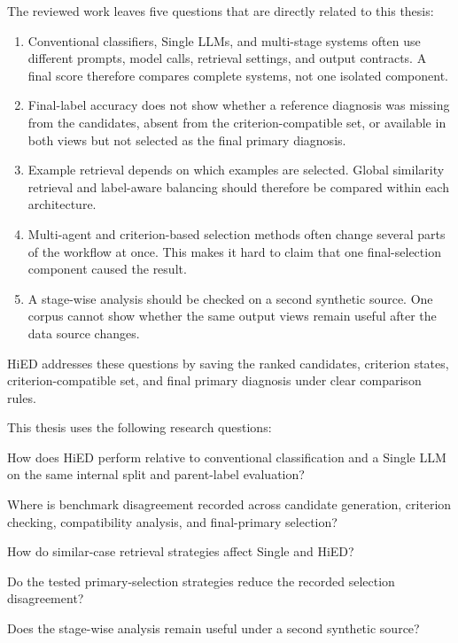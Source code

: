 \documentclass[12pt,a4paper,oneside]{report}
\begin{document}
The reviewed work leaves five questions that are directly related to this thesis:

\begin{enumerate}
    \item Conventional classifiers, Single LLMs, and multi-stage systems often use different prompts, model calls, retrieval settings, and output contracts. A final score therefore compares complete systems, not one isolated component.
    \item Final-label accuracy does not show whether a reference diagnosis was missing from the candidates, absent from the criterion-compatible set, or available in both views but not selected as the final primary diagnosis.
    \item Example retrieval depends on which examples are selected. Global similarity retrieval and label-aware balancing should therefore be compared within each architecture.
    \item Multi-agent and criterion-based selection methods often change several parts of the workflow at once. This makes it hard to claim that one final-selection component caused the result.
    \item A stage-wise analysis should be checked on a second synthetic source. One corpus cannot show whether the same output views remain useful after the data source changes.
\end{enumerate}

HiED addresses these questions by saving the ranked candidates, criterion states, criterion-compatible set, and final primary diagnosis under clear comparison rules.

This thesis uses the following research questions:

\begin{description}[style=nextline,leftmargin=1.5cm,labelwidth=1.1cm,itemsep=0pt,parsep=0pt,topsep=0pt,partopsep=0pt]
\item[RQ1] How does HiED perform relative to conventional classification and a Single LLM on the same internal split and parent-label evaluation?
\item[RQ2] Where is benchmark disagreement recorded across candidate generation, criterion checking, compatibility analysis, and final-primary selection?
\item[RQ3] How do similar-case retrieval strategies affect Single and HiED?
\item[RQ4] Do the tested primary-selection strategies reduce the recorded selection disagreement?
\item[RQ5] Does the stage-wise analysis remain useful under a second synthetic source?
\end{description}
\end{document}
